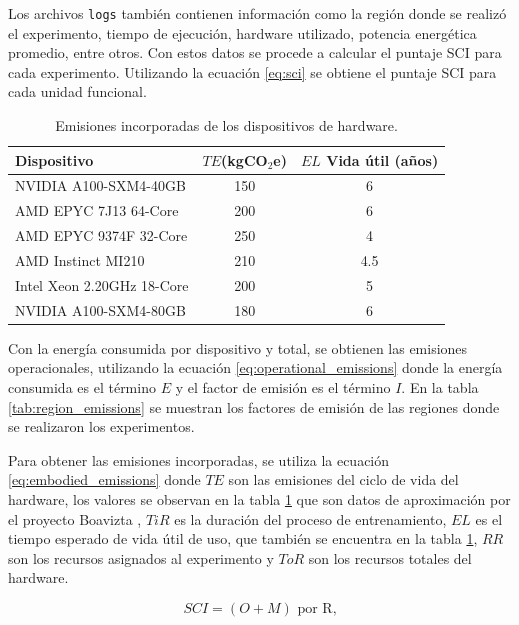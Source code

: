 \documentclass[twocolumn]{article}
\begin{document}
{Los archivos \texttt{logs} también contienen información como la región donde se realizó el experimento, tiempo de ejecución, hardware utilizado, potencia energética promedio, entre otros. Con estos datos se procede a calcular el puntaje SCI para cada experimento. Utilizando la ecuación \ref{eq:sci} se obtiene el puntaje SCI para cada unidad funcional.}

\begin{table}[htbp]
    \centering
    \caption{Emisiones incorporadas de los dispositivos de hardware.}
    \label{tab:embodied_emissions}
    \begin{tabularx}{\columnwidth}{Xcc}
        \toprule
        \textbf{Dispositivo} & \textbf{$TE$(kgCO$_2$e)} & \textbf{$EL$ Vida útil (años)} \\
        \midrule
        NVIDIA A100-SXM4-40GB & 150 & 6 \\
        AMD EPYC 7J13 64-Core & 200 & 6 \\
        AMD EPYC 9374F 32-Core & 250 & 4 \\
        AMD Instinct MI210 & 210 & 4.5 \\
        Intel Xeon 2.20GHz 18-Core & 200 & 5 \\
        NVIDIA A100-SXM4-80GB & 180 & 6 \\
        \bottomrule
    \end{tabularx}
\end{table}

{Con la energía consumida por dispositivo y total, se obtienen las emisiones operacionales, utilizando la ecuación \ref{eq:operational_emissions} donde la energía consumida es el término $E$ y el factor de emisión es el término $I$. En la tabla \ref{tab:region_emissions} se muestran los factores de emisión de las regiones donde se realizaron los experimentos.}

{Para obtener las emisiones incorporadas, se utiliza la ecuación \ref{eq:embodied_emissions} donde $TE$ son las emisiones del ciclo de vida del hardware, los valores se observan en la tabla \ref{tab:embodied_emissions} que son datos de aproximación por el proyecto Boavizta \cite{boaviztadatavizta}, $TiR$ es la duración del proceso de entrenamiento, $EL$ es el tiempo esperado de vida útil de uso, que también se encuentra en la tabla \ref{tab:embodied_emissions}, $RR$ son los recursos asignados al experimento y $ToR$ son los recursos totales del hardware.}

\begin{equation} \label{eq:sci}
    SCI = (O+M) \text{ por R,}
\end{equation}
\end{document}
